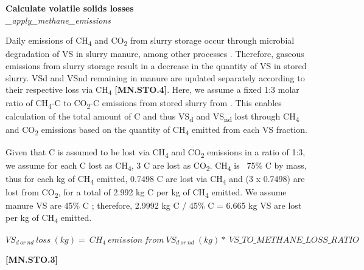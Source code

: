 \begin{refsection}
\begin{itemize}
    \end{itemize}
    \vspace{0.5cm}
    

\textbf{Calculate volatile solids losses}\\
\textit{\_apply\_methane\_emissions}\\
\vspace{0.2cm}

Daily emissions of CH\textsubscript{4} and CO\textsubscript{2} from slurry storage occur through microbial degradation of VS in slurry manure, among other processes \parencite{Petersen2024}. Therefore, gaseous emissions from slurry storage result in a decrease in the quantity of VS in stored slurry. VSd and VSnd remaining in manure are updated separately according to their respective loss via CH\textsubscript{4} \textbf{[MN.STO.4]}. Here, we assume a fixed 1:3 molar ratio of CH\textsubscript{4}-C to CO\textsubscript{2}-C emissions from stored slurry from \cite{Petersen2024}. This enables calculation of the total amount of C and thus VS\textsubscript{d} and VS\textsubscript{nd} lost through CH\textsubscript{4} and CO\textsubscript{2} emissions based on the quantity of CH\textsubscript{4} emitted from each VS fraction.
\vspace{0.2cm}

Given that C is assumed to be lost via CH\textsubscript{4} and CO\textsubscript{2} emissions in a ratio of 1:3, we assume for each C lost as CH\textsubscript{4}, 3 C are lost as CO\textsubscript{2}. CH\textsubscript{4} is ~75\% C by mass, thus for each kg of CH\textsubscript{4} emitted, 0.7498 C are lost via CH\textsubscript{4} and (3 x 0.7498) are lost from CO\textsubscript{2}, for a total of 2.992 kg C per kg of CH\textsubscript{4} emitted. We assume manure VS are 45\% C \parencite{Petersen2024}; therefore, 2.9992 kg C / 45\% C = 6.665 kg VS are lost per kg of CH\textsubscript{4} emitted.


\vspace{0.5cm}

    \begin{center}
        \(VS_{d\ or\ nd}\ loss\ (kg)=\ CH_{4}\ emission\ from\ VS_{d\ or\ nd}\ (kg)*\ VS\_TO\_METHANE\_LOSS\_RATIO\)
    \end{center}
        \vspace{0.5cm} 
    
            {\raggedleft \textbf{[MN.STO.3]}\par}
            \vspace{0.5cm}


\end{refsection}
